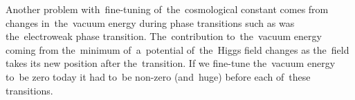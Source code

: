 Another problem with~fine-tuning of~the~cosmological constant comes from changes in~the~vacuum energy during phase transitions such as was the~electroweak phase transition. The~contribution to~the~vacuum energy coming from the~minimum of~a~potential of~the~Higgs field changes as the~field takes its new position after the~transition. %
If we fine-tune the~vacuum energy to~be zero today it had to~be non-zero (and~huge) before each of~these transitions.
